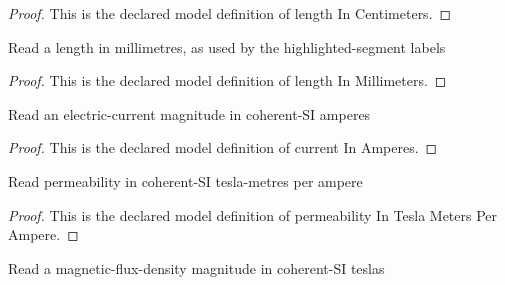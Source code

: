\begin{proof}
  This is the declared model definition of length In Centimeters.
\end{proof}
\begin{definition}
  \label{def:physics:phyx-mini-0960:phyxminiproblems-problemphyxmini0960-lengthinmillimeters}
  Read a length in millimetres, as used by the highlighted-segment labels
\end{definition}
\begin{proof}
  This is the declared model definition of length In Millimeters.
\end{proof}
\begin{definition}
  \label{def:physics:phyx-mini-0960:phyxminiproblems-problemphyxmini0960-currentinamperes}
  Read an electric-current magnitude in coherent-SI amperes
\end{definition}
\begin{proof}
  This is the declared model definition of current In Amperes.
\end{proof}
\begin{definition}
  \label{def:physics:phyx-mini-0960:phyxminiproblems-problemphyxmini0960-permeabilityinteslametersperampere}
  Read permeability in coherent-SI tesla-metres per ampere
\end{definition}
\begin{proof}
  This is the declared model definition of permeability In Tesla Meters Per Ampere.
\end{proof}
\begin{definition}
  \label{def:physics:phyx-mini-0960:phyxminiproblems-problemphyxmini0960-magneticfluxdensityinteslas}
  Read a magnetic-flux-density magnitude in coherent-SI teslas
\end{definition}
